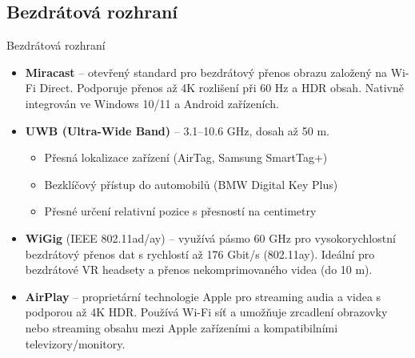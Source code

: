 \documentclass[aspectratio=43]{beamer}
\begin{document}
\subsection{Bezdrátová rozhraní}
\begin{frame}{Bezdrátová rozhraní}
\begin{itemize}
    \item \textbf{Miracast} – otevřený standard pro bezdrátový přenos obrazu založený na Wi-Fi Direct. Podporuje přenos až 4K rozlišení při 60 Hz a HDR obsah. Nativně integrován ve Windows 10/11 a Android zařízeních.
    
    \item \textbf{UWB (Ultra-Wide Band)} – 3.1–10.6 GHz, dosah až 50 m. 
    \begin{itemize}
        \item Přesná lokalizace zařízení (AirTag, Samsung SmartTag+)
        \item Bezklíčový přístup do automobilů (BMW Digital Key Plus)
        \item Přesné určení relativní pozice s přesností na centimetry
    \end{itemize}
    
    \item \textbf{WiGig} (IEEE 802.11ad/ay) – využívá pásmo 60 GHz pro vysokorychlostní bezdrátový přenos dat s rychlostí až 176 Gbit/s (802.11ay). Ideální pro bezdrátové VR headsety a přenos nekomprimovaného videa (do 10 m).
    
    \item \textbf{AirPlay} – proprietární technologie Apple pro streaming audia a videa s podporou až 4K HDR. Používá Wi-Fi síť a umožňuje zrcadlení obrazovky nebo streaming obsahu mezi Apple zařízeními a kompatibilními televizory/monitory.
\end{itemize}

\end{frame}
\end{document}
